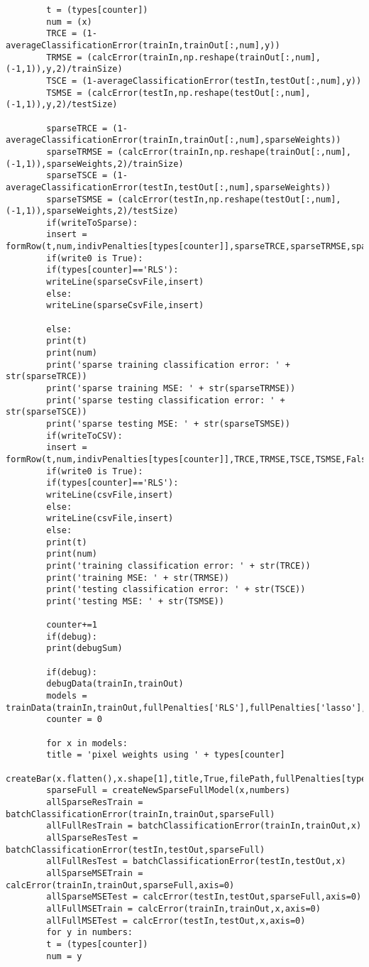 \documentclass[12pt]{article}
\begin{document}
\begin{verbatim}
		t = (types[counter])
		num = (x)
		TRCE = (1-averageClassificationError(trainIn,trainOut[:,num],y))
		TRMSE = (calcError(trainIn,np.reshape(trainOut[:,num],(-1,1)),y,2)/trainSize)
		TSCE = (1-averageClassificationError(testIn,testOut[:,num],y))
		TSMSE = (calcError(testIn,np.reshape(testOut[:,num],(-1,1)),y,2)/testSize)
		
		sparseTRCE = (1-averageClassificationError(trainIn,trainOut[:,num],sparseWeights))
		sparseTRMSE = (calcError(trainIn,np.reshape(trainOut[:,num],(-1,1)),sparseWeights,2)/trainSize)
		sparseTSCE = (1-averageClassificationError(testIn,testOut[:,num],sparseWeights))
		sparseTSMSE = (calcError(testIn,np.reshape(testOut[:,num],(-1,1)),sparseWeights,2)/testSize)
		if(writeToSparse):
		insert = formRow(t,num,indivPenalties[types[counter]],sparseTRCE,sparseTRMSE,sparseTSCE,sparseTSMSE,False)
		if(write0 is True):
		if(types[counter]=='RLS'):
		writeLine(sparseCsvFile,insert)
		else:
		writeLine(sparseCsvFile,insert)
		
		else:
		print(t)
		print(num)
		print('sparse training classification error: ' + str(sparseTRCE))
		print('sparse training MSE: ' + str(sparseTRMSE))
		print('sparse testing classification error: ' + str(sparseTSCE))
		print('sparse testing MSE: ' + str(sparseTSMSE))
		if(writeToCSV):
		insert = formRow(t,num,indivPenalties[types[counter]],TRCE,TRMSE,TSCE,TSMSE,False)
		if(write0 is True):
		if(types[counter]=='RLS'):
		writeLine(csvFile,insert)
		else:
		writeLine(csvFile,insert)
		else:
		print(t)
		print(num)
		print('training classification error: ' + str(TRCE))
		print('training MSE: ' + str(TRMSE))
		print('testing classification error: ' + str(TSCE))
		print('testing MSE: ' + str(TSMSE))
		
		counter+=1
		if(debug):
		print(debugSum)
		
		if(debug):
		debugData(trainIn,trainOut)
		models = trainData(trainIn,trainOut,fullPenalties['RLS'],fullPenalties['lasso'],recompData,filePath,True)
		counter = 0
		
		for x in models:
		title = 'pixel weights using ' + types[counter]
		createBar(x.flatten(),x.shape[1],title,True,filePath,fullPenalties[types[counter]],types[counter])
		sparseFull = createNewSparseFullModel(x,numbers)
		allSparseResTrain = batchClassificationError(trainIn,trainOut,sparseFull)
		allFullResTrain = batchClassificationError(trainIn,trainOut,x)
		allSparseResTest = batchClassificationError(testIn,testOut,sparseFull)
		allFullResTest = batchClassificationError(testIn,testOut,x)
		allSparseMSETrain = calcError(trainIn,trainOut,sparseFull,axis=0)
		allSparseMSETest = calcError(testIn,testOut,sparseFull,axis=0)
		allFullMSETrain = calcError(trainIn,trainOut,x,axis=0)
		allFullMSETest = calcError(testIn,testOut,x,axis=0)
		for y in numbers:
		t = (types[counter])
		num = y
		

\end{verbatim}
\end{document}
